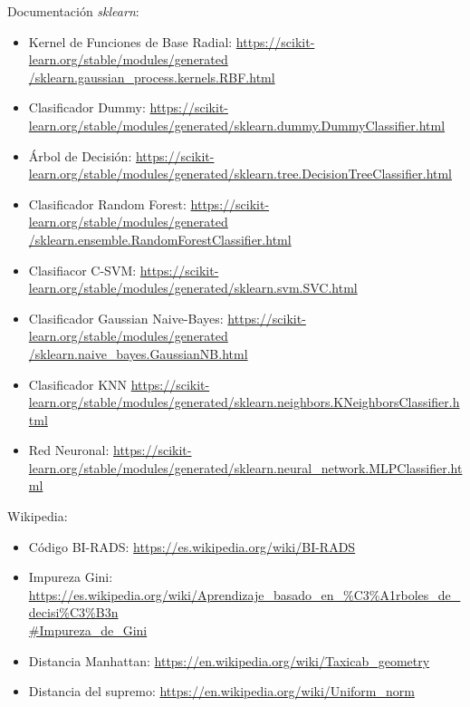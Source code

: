 \documentclass{article}
\begin{document}
Documentación \textit{sklearn}:
\begin{itemize}
\item Kernel de Funciones de Base Radial: \href{https://scikit-learn.org/stable/modules/generated/sklearn.gaussian_process.kernels.RBF.html}{https://scikit-learn.org/stable/modules/generated\\/sklearn.gaussian\_process.kernels.RBF.html}
\item Clasificador Dummy: \href{https://scikit-learn.org/stable/modules/generated/sklearn.dummy.DummyClassifier.html}{https://scikit-learn.org/stable/modules/generated/sklearn.dummy.DummyClassifier.html}
\item Árbol de Decisión: \href{https://scikit-learn.org/stable/modules/generated/sklearn.tree.DecisionTreeClassifier.html}{https://scikit-learn.org/stable/modules/generated/sklearn.tree.DecisionTreeClassifier.html}
\item Clasificador Random Forest: \href{https://scikit-learn.org/stable/modules/generated/sklearn.ensemble.RandomForestClassifier.html}{https://scikit-learn.org/stable/modules/generated\\/sklearn.ensemble.RandomForestClassifier.html}
\item Clasifiacor C-SVM: \href{https://scikit-learn.org/stable/modules/generated/sklearn.svm.SVC.html}{https://scikit-learn.org/stable/modules/generated/sklearn.svm.SVC.html}
\item Clasificador Gaussian Naive-Bayes: \href{https://scikit-learn.org/stable/modules/generated/sklearn.naive_bayes.GaussianNB.html}{https://scikit-learn.org/stable/modules/generated\\/sklearn.naive\_bayes.GaussianNB.html}
\item Clasificador KNN \href{https://scikit-learn.org/stable/modules/generated/sklearn.neighbors.KNeighborsClassifier.html}{https://scikit-learn.org/stable/modules/generated/sklearn.neighbors.KNeighborsClassifier.html}
\item Red Neuronal: \href{https://scikit-learn.org/stable/modules/generated/sklearn.neural_network.MLPClassifier.html}{https://scikit-learn.org/stable/modules/generated/sklearn.neural\_network.MLPClassifier.html}
\end{itemize}

Wikipedia:
\begin{itemize}
\item Código BI-RADS: \href{https://es.wikipedia.org/wiki/BI-RADS}{https://es.wikipedia.org/wiki/BI-RADS}
\item Impureza Gini: \href{https://es.wikipedia.org/wiki/Aprendizaje_basado_en_%C3%A1rboles_de_decisi%C3%B3n#Impureza_de_Gini}
    {https://es.wikipedia.org/wiki/Aprendizaje\_basado\_en\_\%C3\%A1rboles\_de\_decisi\%C3\%B3n\\\#Impureza\_de\_Gini}
\item Distancia Manhattan: \href{https://en.wikipedia.org/wiki/Taxicab_geometry}{https://en.wikipedia.org/wiki/Taxicab\_geometry}
\item Distancia del supremo: \href{https://en.wikipedia.org/wiki/Uniform_norm}{https://en.wikipedia.org/wiki/Uniform\_norm}
\end{itemize}
\end{document}
